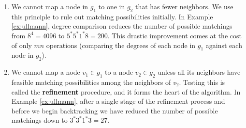 \documentclass[12pt]{thesis}
\theoremstyle{plain}
\theoremstyle{definition}
\theoremstyle{remark}
\begin{document}
\begin{enumerate}
\item We cannot map a node in $g_1$ to one in $g_2$ that has fewer neighbors. We use this principle to rule out matching possibilities initially. In Example \ref{ex:ullmann}, degree comparison reduces the number of possible matchings from $8^4=4096$ to $5^*5^*1^*8=200$. This drastic improvement comes at the cost of only $mn$ operations (comparing the degrees of each node in $g_1$ against each node in $g_2$).

\item We cannot map a node $v_1\in g_1$ to a node $v_2\in g_2$ unless all its neighbors have feasible matching possibilities among the neighbors of $v_2$. Testing this is called the \textbf{refinement} procedure, and it forms the heart of the algorithm. In Example \ref{ex:ullmann}, after a single stage of the refinement process and before we begin backtracking we have reduced the number of possible matchings down to $3^*3^*1^*3=27$.
\end{enumerate}
\end{document}
